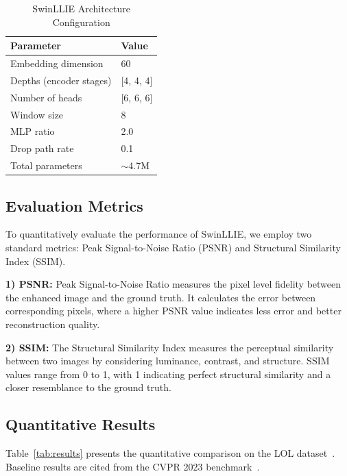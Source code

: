 \documentclass[sigconf]{acmart}
\begin{document}
\begin{table}[htbp]
\caption{SwinLLIE Architecture Configuration}
\centering
\begin{tabular}{ll}
\toprule
\textbf{Parameter} & \textbf{Value} \\
\midrule
Embedding dimension & 60 \\
Depths (encoder stages) & [4, 4, 4] \\
Number of heads & [6, 6, 6] \\
Window size & 8 \\
MLP ratio & 2.0 \\
Drop path rate & 0.1 \\
Total parameters & $\sim$4.7M \\
\bottomrule
\end{tabular}
\label{tab:config}
\end{table}

\subsection{Evaluation Metrics}

To quantitatively evaluate the performance of SwinLLIE, we employ two standard metrics: Peak Signal-to-Noise Ratio (PSNR) and Structural Similarity Index (SSIM).

\textbf{1) PSNR:} Peak Signal-to-Noise Ratio measures the pixel level fidelity between the enhanced image and the ground truth. It calculates the error between corresponding pixels, where a higher PSNR value indicates less error and better reconstruction quality.

\textbf{2) SSIM:} The Structural Similarity Index measures the perceptual similarity between two images by considering luminance, contrast, and structure. SSIM values range from 0 to 1, with 1 indicating perfect structural similarity and a closer resemblance to the ground truth.

\subsection{Quantitative Results}

Table~\ref{tab:results} presents the quantitative comparison on the LOL dataset~\cite{lol_dataset}. Baseline results are cited from the CVPR 2023 benchmark~\cite{xu2023smg}.
\end{document}
